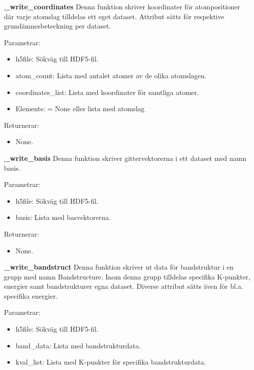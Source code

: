 \documentclass[a4paper,12pt]{article}
\begin{document}
\textbf{\_write\_coordinates} \newline
Denna funktion skriver koordinater för atompositioner där varje atomslag tilldelas ett eget dataset. Attribut sätts för respektive grundämnesbeteckning per dataset.

Parametrar:
\begin{itemize}
\setlength\itemsep{0em}
\item h5file: Sökväg till HDF5-fil.
\item atom\_count: Lista med antalet atomer av de olika atomslagen.
\item coordinates\_list: Lista med koordinater för samtliga atomer.
\item Elements: = None eller lista med atomslag
\end{itemize}

Returnerar:
\begin{itemize}
\setlength\itemsep{0em}
\item None.
\end{itemize}

\textbf{\_write\_basis} \newline
Denna funktion skriver gittervektorerna i ett dataset med namn basis.

Parametrar:
\begin{itemize}
\setlength\itemsep{0em}
\item h5file: Sökväg till HDF5-fil.
\item basis: Lista med basvektorerna.
\end{itemize}

Returnerar:
\begin{itemize}
\setlength\itemsep{0em}
\item None.
\end{itemize}

\textbf{\_write\_bandstruct} \newline
Denna funktion skriver ut data för bandstruktur i en grupp med namn Bandstructure. Inom denna
grupp tilldelas specifika K-punkter, energier samt bandstrukturer egna dataset. Diverse attribut sätts även för bl.a. specifika energier.

Parametrar:
\begin{itemize}
\setlength\itemsep{0em}
\item h5file: Sökväg till HDF5-fil.
\item band\_data: Lista med bandstrukturdata.
\item kval\_list: Lista med K-punkter för specifika bandstrukturdata.
\end{itemize}
\end{document}
